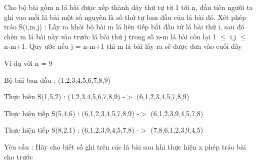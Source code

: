 Cho bộ bài gồm n lá bài được xếp thành dãy thứ tự từ 1 tới n, đầu tiên người ta ghi vao mỗi lá bài một số nguyên là số thứ tự ban đầu của lá bài đó. Xét phép tráo S(i,m,j) : Lấy ra khỏi bộ bài m lá liên tiếp bắt đầu từ lá bài thứ i, sau đó chèn m lá bài này vào trước lá bài thứ j trong số n-m lá bài còn lại 1 $\le$ i,j $\le$ n-m+1. Quy ước nếu j = n-m+1 thì m lá bài lấy ra sẽ được đưa vào cuối dãy  

   Ví dụ với n = 9  

   Bộ bài ban đầu : (1,2,3,4,5,6,7,8,9)  

   Thực hiện S(1,5,2) : (1,2,3,4,5,6,7,8,9) -$>$ (6,1,2,3,4,5,7,8,9)  

   Thực hiện tiếp S(5,4,6) : (6,1,2,3,4,5,7,8,9) -$>$ (6,1,2,3,9,4,5,7,8)  

   Thực hiện tiếp S(8,2,1) : (6,1,2,3,9,4,5,7,8) -$>$ (7,8,6,1,2,3,9,4,5)  

   Yêu cầu : Hãy cho biết số ghi trên các lá bài sau khi thực hiện x phép tráo bài cho trước